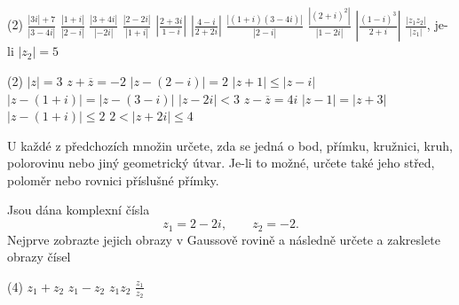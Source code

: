 \documentclass[12pt,a4paper]{article}
\begin{document}
\begin{exercise}[Vypočítejte]
    \begin{tasks}(2)
        \task $\displaystyle \frac{|3i|+7}{|3-4i|}$
        \task $\displaystyle \frac{|1+i|}{|2-i|}$
        \task $\displaystyle \frac{|3+4i|}{|-2i|}$
        \task $\displaystyle \frac{|2-2i|}{|1+i|}$
        \task $\displaystyle \left|\frac{2+3i}{1-i}\right|$
        \task $\displaystyle \left|\frac{4-i}{2+2i}\right|$
        \task $\displaystyle \frac{|(1+i)(3-4i)|}{|2-i|}$
        \task $\displaystyle \frac{|(2+i)^2|}{|1-2i|}$
        \task $\displaystyle \left|\frac{(1-i)^3}{2+i}\right|$
        \task $\displaystyle \frac{|z_1z_2|}{|z_1|}$, je-li $|z_2|=5$
    \end{tasks}
\end{exercise}


\begin{exercise}
        \begin{tasks}(2)
            \task $|z|=3$
            \task $z+\overline{z}=-2$
            \task $|z-(2-i)|=2$
            \task $|z+1|\leq|z-i|$
            \task $|z-(1+i)|=|z-(3-i)|$
            \task $|z-2i|<3$
            \task $z-\overline{z}=4i$
            \task $|z-1|=|z+3|$
            \task $|z-(1+i)|\leq2$
            \task $2<|z+2i|\leq4$
        \end{tasks}
\end{exercise}


\begin{exercise}
    U každé z předchozích množin určete, zda se jedná o bod, přímku, kružnici, kruh, polorovinu nebo jiný geometrický útvar. Je-li to možné, určete také jeho střed, poloměr nebo rovnici příslušné přímky.
\end{exercise}


\begin{exercise}
    Jsou dána komplexní čísla
    \[
        z_1=2-2i,
        \qquad
        z_2=-2.
    \]
    Nejprve zobrazte jejich obrazy v Gaussově rovině a následně určete a zakreslete obrazy čísel

        \begin{tasks}(4)
            \task $z_1+z_2$
            \task $z_1-z_2$
            \task $z_1z_2$
            \task $\displaystyle \frac{z_1}{z_2}$
        \end{tasks}
\end{exercise}
\end{document}
